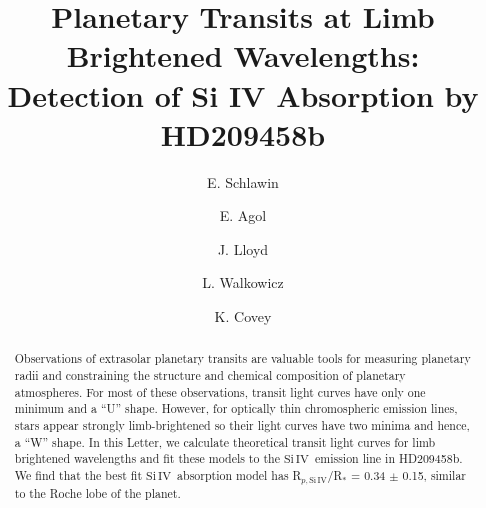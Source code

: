 \documentclass[manuscript]{aastex}
\newcommand{\siIV}{\ensuremath{\mathrm{Si}\,\scriptstyle \mathrm{IV}}}
\begin{document}

\title{Planetary Transits at Limb Brightened Wavelengths:\\
Detection of Si IV Absorption by HD209458b}


\author{E. Schlawin} 
\author{E. Agol}
\author{J. Lloyd}
\author{L. Walkowicz}
\author{K. Covey}







\begin{abstract}
Observations of extrasolar planetary transits are valuable tools for measuring planetary radii and  constraining the structure and chemical composition of planetary atmospheres. For most of these observations, transit light curves have only one minimum and a  ``U'' shape. However, for optically thin chromospheric emission lines, stars appear strongly limb-brightened so their light curves have two minima and hence, a ``W'' shape. In this Letter, we calculate theoretical transit light curves for limb brightened wavelengths and fit these models to the \siIV\ emission line in HD209458b. We find that the best fit \siIV\ absorption model has R$_{p,\siIV}$/R$_*$ = 0.34 $\pm$ 0.15, similar to the Roche lobe of the planet.
\end{abstract}
\end{document}
